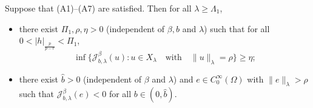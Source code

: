 \documentclass[reqno]{amsart}
\begin{document}
\begin{lemma}\label{L3.1} 
Suppose that {\rm (A1)--(A7)} are satisfied. Then for all $\lambda\geq\Lambda_1$,
\begin{itemize}
\item[(i)] there exist $\Pi_1, \rho, \eta>0$ (independent of $\beta, b$ and 
$\lambda$) such that for all $0<|h|_{\frac{p}{p-r}}<\Pi_1$,
$$
\inf \{\mathcal{J}^\beta_{b,\lambda}(u): u\in X_\lambda \quad \text{with}\quad
 \|u\|_\lambda=\rho \}\geq\eta;
$$

\item[(ii)] there exist $\widehat{b}>0$ (independent of $\beta$ and $\lambda$) and 
$e\in C_0^\infty(\Omega)$ with $\|e\|_\lambda>\rho$ such that 
$\mathcal{J}^\beta_{b,\lambda}(e)<0$ for all $b\in(0,\widehat{b})$.
\end{itemize}
\end{lemma}
\end{document}
